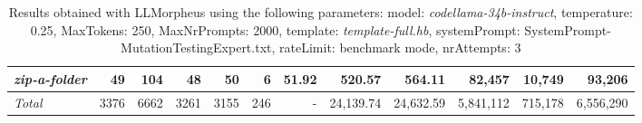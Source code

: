 \begin{table*}
{\begin{tabular}{l||r|r|r|r|r|r||r|r||r|r|r}
   \hline
   \textit{zip-a-folder} & 49 & 104 & 48 & 50 & 6 & 51.92 & 520.57 & 564.11 & 82,457 & 10,749 & 93,206 \\ 
   \hline
   \textit{Total} & 3376 & 6662 & 3261 & 3155 & 246 & - & 24,139.74  & 24,632.59 & 5,841,112 & 715,178 & 6,556,290 \\ 
 \end{tabular}
 }
 \caption{Results obtained with LLMorpheus using the following parameters: 
   model: \textit{codellama-34b-instruct}, 
   temperature: 0.25, 
   MaxTokens: 250, 
   MaxNrPrompts: 2000, 
   template: \textit{template-full.hb}, 
   systemPrompt: SystemPrompt-MutationTestingExpert.txt, 
   rateLimit: benchmark mode, 
   nrAttempts: 3  
 }
\end{table*}

